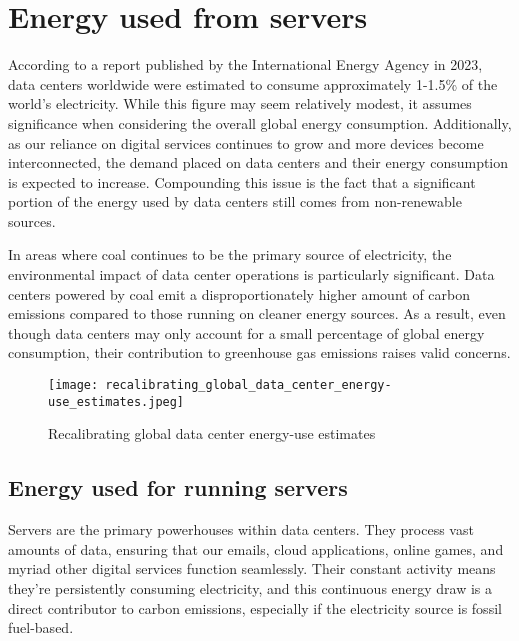 \documentclass[
  a4paper,  %
  twoside,  %
  bibliography=totoc,
  headsepline,
  cleardoublepage=empty,
  parskip=half,
  draft=false
]{scrbook}
\begin{document}



\chapter{Energy used from servers}

According to a report published by the International Energy Agency\cite{ieaDataCentres} in 2023, data centers worldwide were estimated to consume approximately 1-1.5\% of the world's electricity. While this figure may seem relatively modest, it assumes significance when considering the overall global energy consumption. Additionally, as our reliance on digital services continues to grow and more devices become interconnected, the demand placed on data centers and their energy consumption is expected to increase\cite{schomaker2015energy}. Compounding this issue is the fact that a significant portion of the energy used by data centers still comes from non-renewable sources\cite{ritchie2024energy}.

In areas where coal continues to be the primary source of electricity, the environmental impact of data center operations is particularly significant\cite{finkelman2021future}. Data centers powered by coal emit a disproportionately higher amount of carbon emissions compared to those running on cleaner energy sources. As a result, even though data centers may only account for a small percentage of global energy consumption, their contribution to greenhouse gas emissions raises valid concerns.


\begin{figure}
	\centering
	\texttt{[image: recalibrating\_global\_data\_center\_energy-use\_estimates.jpeg]}
	\caption{Recalibrating global data center energy-use estimates\cite{doi:10.1126/science.aba3758}}
\end{figure}


\section{Energy used for running servers}

Servers are the primary powerhouses within data centers. They process vast amounts of data, ensuring  that  our  emails,  cloud  applications,  online games,  and  myriad  other  digital  services function seamlessly\cite{techtargetMajorServer}. Their constant  activity means they're persistently consuming electricity\cite{energyinnovationMuchEnergy}, and this continuous energy draw is a direct contributor to carbon emissions, especially if the electricity source is fossil fuel-based.
\end{document}
